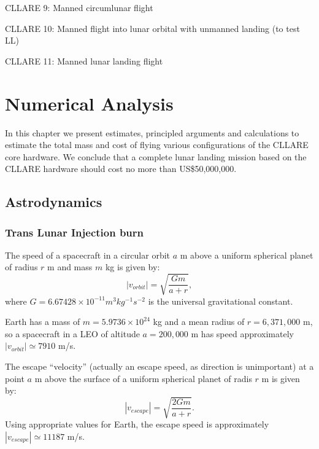 \documentclass{report}
\begin{document}
CLLARE 9: Manned circumlunar flight

CLLARE 10: Manned flight into lunar orbital with unmanned landing (to test LL)

CLLARE 11: Manned lunar landing flight


\chapter{Numerical Analysis} \label{chap:numeric}

In this chapter we present estimates, principled arguments and calculations to estimate the total mass and cost of flying various configurations of the CLLARE core hardware.  We conclude that a complete lunar landing mission based on the CLLARE hardware should cost no more than US\$50,000,000.

\section{Astrodynamics}

\subsection{Trans Lunar Injection burn} \label{sec:tli}

The speed of a spacecraft in a circular orbit $a$ m above a uniform spherical planet of radius $r$ m and mass $m$ kg is given by:
\begin{equation} \label{eq:v_orbit}
|v_{orbit}| = \sqrt{\frac{Gm}{a+r}},
\end{equation}
where $G = 6.67428 \times 10^{-11} m^3 kg^{-1} s^{-2}$ is the universal gravitational constant.

Earth has a mass of $m = 5.9736 \times 10^{24}$ kg and a mean radius of $r = 6,371,000$ m, so a spacecraft in a LEO of altitude $a = 200,000$ m has speed approximately $|v_{orbit}| \simeq 7910$ m/s.

The escape ``velocity'' (actually an escape speed, as direction is unimportant) at a point $a$ m above the surface of a uniform spherical planet of radis $r$ m is given by:
\begin{equation} \label{eq:v_escape}
|v_{escape}| = \sqrt{\frac{2Gm}{a+r}}.
\end{equation}
Using appropriate values for Earth, the escape speed is approximately $|v_{escape}| \simeq 11187$ m/s.
\end{document}
